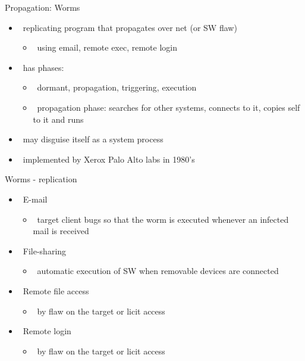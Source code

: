 \documentclass{beamer}
\begin{document}
\begin{frame}{Propagation: Worms}
  \begin{itemize}
  \item  replicating program that propagates over net (or SW flaw)
    \begin{itemize}
    \item  using email, remote exec, remote login 
    \end{itemize}
  \item  has phases: 
    \begin{itemize}
    \item  dormant, propagation, triggering, execution 
    \item  propagation phase: searches for other systems, connects to 
      it, copies self to it and runs 
    \end{itemize}
  \item  may disguise itself as a system process 
  \item  implemented by Xerox Palo Alto labs in 1980's
  \end{itemize}
\end{frame}

\begin{frame}{Worms - replication}
  \begin{itemize}
  \item  E-mail
    \begin{itemize}
    \item  target client bugs so that the worm is executed whenever an
      infected mail is received
    \end{itemize}
  \item  File-sharing
    \begin{itemize}
    \item  automatic execution of SW when removable devices are connected
    \end{itemize}
  \item  Remote file access
    \begin{itemize}
    \item  by flaw on the target or licit access
    \end{itemize}
  \item  Remote login
    \begin{itemize}
    \item  by flaw on the target or licit access
    \end{itemize}
  \end{itemize}
\end{frame}
\end{document}
